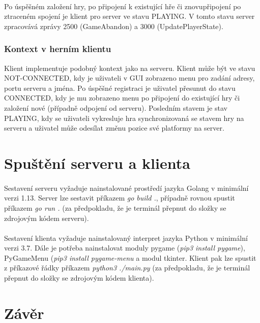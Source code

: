 \documentclass[12pt, a4paper]{article}
\begin{document}
\paragraph{}
Po úspěšném založení hry, po připojení k existující hře či znovupřipojení po ztraceném spojení je klient pro server
ve stavu PLAYING. V tomto stavu server zpracovává zprávy 2500 (GameAbandon) a 3000 (UpdatePlayerState).

\subsubsection{Kontext v herním klientu}
Klient implementuje podobný kontext jako na serveru. Klient může být ve stavu NOT-CONNECTED, kdy je uživateli v GUI
zobrazeno menu pro zadání adresy, portu serveru a jména. Po úspěšné registraci je uživatel přesunut do stavu
CONNECTED, kdy je mu zobrazeno menu po připojení do existující hry či založení nové (případně odpojení od serveru).
Posledním stavem je stav PLAYING, kdy se uživateli vykresluje hra synchronizovaná se stavem hry na serveru a uživatel
může odesílat změnu pozice své platformy na server.


\newpage
\section{Spuštění serveru a klienta}
\paragraph{}
Sestavení serveru vyžaduje nainstalované prostředí jazyka Golang v minimální verzi 1.13. Server lze sestavit příkazem
\textit{go build .}, případně rovnou spustit příkazem \textit{go run .} (za předpokladu, že je terminál přepnut do
složky se zdrojovým kódem serveru).

\paragraph{}
Sestavení klienta vyžaduje nainstalovaný interpret jazyka Python v minimální verzi 3.7. Dále je potřeba nainstalovat
moduly pygame (\textit{pip3 install pygame}), PyGameMenu (\textit{pip3 install pygame-menu} a modul tkinter. Klient
pak lze spustit z příkazové řádky příkazem \textit{python3 ./main.py}  (za předpokladu, že je terminál přepnut do
složky se zdrojovým kódem klienta).

\newpage
\section{Závěr}
\end{document}
